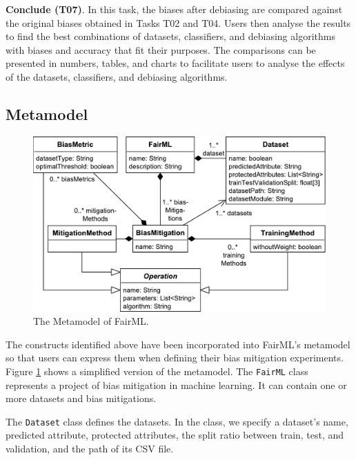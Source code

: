 \documentclass[sigconf,review]{acmart}
\begin{document}
{		\textbf{Conclude (T07)}. In this task, the biases after debiasing are compared against the original biases obtained in Tasks T02 and T04. Users then analyse the results to find the best combinations of datasets, classifiers, and debiasing algorithms with biases and accuracy that fit their purposes. The comparisons can be presented in numbers, tables, and charts to facilitate users to analyse the effects of the datasets, classifiers, and debiasing algorithms. 
		
		\subsection{Metamodel}
		\label{sec:metamodel}
		
		\begin{figure}
			\includegraphics[width=\linewidth]{figures/metamodel}
			\caption{The Metamodel of FairML.}
			\label{fig:metamodel}
		\end{figure}
		
		The constructs identified above have been incorporated into FairML's metamodel so that users can express them when defining their bias mitigation experiments. Figure \ref{fig:metamodel} shows a simplified version of the metamodel. The \texttt{FairML} class represents a project of bias mitigation in machine learning. It can contain one or more datasets and bias mitigations. 
		
		The \texttt{Dataset} class defines the datasets. In the class, we specify a dataset's name, predicted attribute, protected attributes, the split ratio between train, test, and validation, and the path of its CSV file.
		
}
\end{document}
